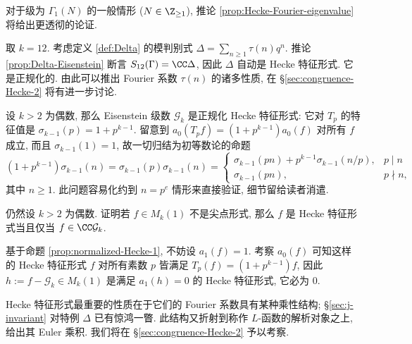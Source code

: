 对于级为 $\Gamma_1(N)$ 的一般情形 ($N \in \Z_{\geq 1}$), 推论 \ref{prop:Hecke-Fourier-eigenvalue} 将给出更透彻的论证.

\begin{example}\label{eg:full-level-eigenform-1}
	取 $k = 12$. 考虑定义 \ref{def:Delta} 的模判别式 $\Delta = \sum_{n \geq 1} \tau(n) q^n$. 推论 \ref{prop:Delta-Eisenstein} 断言 $S_{12}(\Gamma) = \CC \Delta$, 因此 $\Delta$ 自动是 Hecke 特征形式. 它是正规化的. 由此可以推出 Fourier 系数 $\tau(n)$ 的诸多性质, 在 \S\ref{sec:congruence-Hecke-2} 将有进一步讨论.
\end{example}

\begin{example}
	设 $k > 2$ 为偶数, 那么 Eisenstein 级数 $\mathcal{G}_k$ 是正规化 Hecke 特征形式: 它对 $T_p$ 的特征值是 $\sigma_{k-1}(p) = 1 + p^{k-1}$. 留意到 $a_0(T_p f) = (1 + p^{k-1}) a_0(f)$ 对所有 $f$ 成立, 而且 $\sigma_{k-1}(1) = 1$, 故一切归结为初等数论的命题
	\[ \left( 1 + p^{k-1} \right) \sigma_{k-1}(n) = \sigma_{k-1}(p) \sigma_{k-1}(n) = \begin{cases}
		\sigma_{k-1}(pn) + p^{k-1} \sigma_{k-1}(n/p), & p \mid n \\
		\sigma_{k-1}(pn), & p \nmid n,
	\end{cases}\]
	其中 $n \geq 1$. 此问题容易化约到 $n = p^e$ 情形来直接验证, 细节留给读者消遣.
\end{example}

\begin{exercise}
	仍然设 $k > 2$ 为偶数. 证明若 $f \in M_k(1)$ 不是尖点形式, 那么 $f$ 是 Hecke 特征形式当且仅当 $f \in \CC \mathcal{G}_k$.
	
	\begin{hint}
		基于命题 \ref{prop:normalized-Hecke-1}, 不妨设 $a_1(f) = 1$. 考察 $a_0(f)$ 可知这样的 Hecke 特征形式 $f$ 对所有素数 $p$ 皆满足 $T_p(f) = (1 + p^{k-1}) f$, 因此 $h := f - \mathcal{G}_k \in M_k(1)$ 是满足 $a_1(h) = 0$ 的 Hecke 特征形式, 它必为 $0$.
	\end{hint}
\end{exercise}

Hecke 特征形式最重要的性质在于它们的 Fourier 系数具有某种乘性结构; \S\ref{sec:j-invariant} 对特例 $\Delta$ 已有惊鸿一瞥. 此结构又折射到称作 $L$-函数的解析对象之上, 给出其 Euler 乘积. 我们将在 \S\ref{sec:congruence-Hecke-2} 予以考察. 
